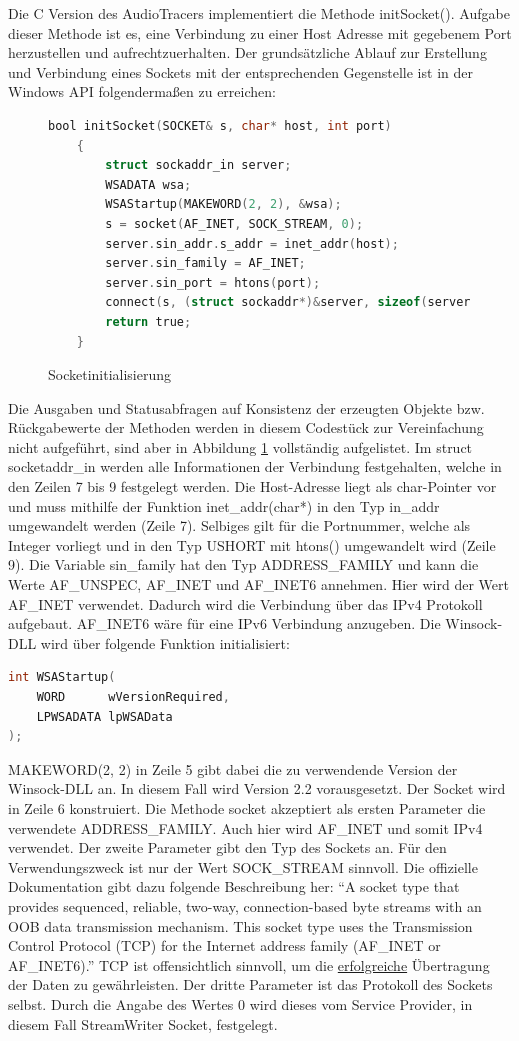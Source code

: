 Die C Version des AudioTracers implementiert die Methode initSocket(). Aufgabe dieser Methode ist es, eine Verbindung zu einer Host Adresse mit gegebenem Port herzustellen und aufrechtzuerhalten. Der grundsätzliche Ablauf zur Erstellung und Verbindung eines Sockets mit der entsprechenden Gegenstelle ist in der Windows API folgendermaßen zu erreichen:
\begin{figure}[h!]
\begin{lstlisting}[language=C, frame=none]
	bool initSocket(SOCKET& s, char* host, int port)
	{
		struct sockaddr_in server;
		WSADATA wsa;
		WSAStartup(MAKEWORD(2, 2), &wsa);
		s = socket(AF_INET, SOCK_STREAM, 0);
		server.sin_addr.s_addr = inet_addr(host);
		server.sin_family = AF_INET;
		server.sin_port = htons(port);
		connect(s, (struct sockaddr*)&server, sizeof(server));
		return true;
	}
\end{lstlisting}
	\caption{Socketinitialisierung}
\label{fig:initSocket}
\end{figure}

Die Ausgaben und Statusabfragen auf Konsistenz der erzeugten Objekte bzw. Rückgabewerte der Methoden werden in diesem Codestück zur Vereinfachung nicht aufgeführt, sind aber in Abbildung \ref{fig:initSocket} vollständig aufgelistet. Im struct socketaddr\_in werden alle Informationen der Verbindung festgehalten, welche in den Zeilen 7 bis 9 festgelegt werden. Die Host-Adresse liegt als char-Pointer vor und muss mithilfe der Funktion inet\_addr(char*) in den Typ in\_addr umgewandelt werden (Zeile 7). Selbiges gilt für die Portnummer, welche als Integer vorliegt und in den Typ USHORT mit htons() umgewandelt wird (Zeile 9). Die Variable sin\_family hat den Typ ADDRESS\_FAMILY und kann die Werte AF\_UNSPEC, AF\_INET und AF\_INET6 annehmen. Hier wird der Wert AF\_INET verwendet. Dadurch wird die Verbindung über das IPv4 Protokoll aufgebaut. AF\_INET6 wäre für eine IPv6 Verbindung anzugeben.
Die Winsock-DLL wird über folgende Funktion initialisiert:
\begin{lstlisting}[language=C, frame=none]
	int WSAStartup(
	WORD      wVersionRequired,
	LPWSADATA lpWSAData
);
\end{lstlisting}

MAKEWORD(2, 2) in Zeile 5 gibt dabei die zu verwendende Version der Winsock-DLL an. In diesem Fall wird Version 2.2 vorausgesetzt. Der Socket wird in Zeile 6 konstruiert. Die Methode socket akzeptiert als ersten Parameter die verwendete ADDRESS\_FAMILY. Auch hier wird AF\_INET und somit IPv4 verwendet. Der zweite Parameter gibt den Typ des Sockets an. Für den Verwendungszweck ist nur der Wert  SOCK\_STREAM sinnvoll. Die offizielle Dokumentation \cite{ms_docs_winsock} gibt dazu folgende Beschreibung her: \enquote{A socket type that provides sequenced, reliable, two-way, connection-based byte streams with an OOB data transmission mechanism. This socket type uses the Transmission Control Protocol (TCP) for the Internet address family (AF\_INET or AF\_INET6).} TCP ist offensichtlich sinnvoll, um die \underline{erfolgreiche} Übertragung der Daten zu gewährleisten. Der dritte Parameter ist das Protokoll des Sockets selbst. Durch die Angabe des Wertes 0 wird dieses vom Service Provider, in diesem Fall StreamWriter Socket, festgelegt.

